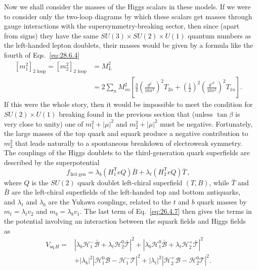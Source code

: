 Now we shall consider the masses of the Higgs scalars in these models. If
we were to consider only the two-loop diagrams by which these scalars get
masses through gauge interactions with the supersymmetry-breaking sector,
then since (apart from signs) they have the same
\(SU(3)\times SU(2)\times U(1)\) quantum numbers as the
left-handed lepton doublets, their masses would be given by a formula like
the fourth of Eqs.~\eqref{eq:28.6.4}
\begin{equation}
  \begin{aligned}
    [m_1^2]_{\text{2 loop}}=[m_2^2]_{\text{2 loop}}
    &=M_L^2\\
    &=2\sum_nM_{sn}^2
      \left[
        \frac{3}{4}\left(\frac{g^2}{16\pi^2}\right)^2T_{2n}
        +\left(\frac{1}{2}\right)^2
         \left(\frac{g'^2}{16\pi^2}\right)^2T_{1n}
      \right] .
  \end{aligned}
  \tag{28.6.23}\label{eq:28.6.23}
\end{equation}
If this were the whole story, then it would be impossible to meet the
condition for \(SU(2)\times U(1)\) breaking found in the previous
section that (unless \(\tan\beta\) is very close to unity) one of
\(m_1^2+\lvert\mu\rvert^2\) and \(m_2^2+\lvert\mu\rvert^2\) must be
negative. Fortunately, the large masses of the top quark and squark
produce a negative contribution to \(m_2^2\) that leads naturally to a
spontaneous breakdown of electroweak symmetry. The couplings of the Higgs
doublets to the third-generation quark superfields are described by the
superpotential
\begin{equation}
  f_{\text{3rd gen}}
  =\lambda_b(H_1^{\mathsf T}eQ)\bar B
   +\lambda_t(H_2^{\mathsf T}eQ)\bar T\,,
  \tag{28.6.24}\label{eq:28.6.24}
\end{equation}
where \(Q\) is the \(SU(2)\) quark doublet left-chiral superfield
\((T,B)\), while \(\bar T\) and \(\bar B\) are the left-chiral
superfields of the left-handed top and bottom antiquarks, and
\(\lambda_t\) and \(\lambda_b\) are the Yukawa couplings, related to the
\(t\) and \(b\) quark masses by \(m_t=\lambda_tv_2\) and
\(m_b=\lambda_bv_1\). The last term of Eq.~\eqref{eq:26.4.7} then gives
the terms in the potential involving an interaction between the squark
fields and Higgs fields as
\begin{equation}
  \begin{aligned}
    V_{\mathrm{sq}\,H}={}&
      \left|
        \lambda_b\mathcal{H}_1^-\bar{\mathcal B}
        +\lambda_t\mathcal{H}_2^0\bar{\mathcal T}
      \right|^2
      +\left|
        \lambda_b\mathcal{H}_1^0\bar{\mathcal B}
        +\lambda_t\mathcal{H}_2^+\bar{\mathcal T}
      \right|^2\\
      &+\lvert\lambda_b\rvert^2
      \left|\mathcal{H}_1^0\mathcal B-\mathcal{H}_1^-\mathcal T\right|^2
      +\lvert\lambda_t\rvert^2
      \left|\mathcal{H}_2^+\mathcal B-\mathcal{H}_2^0\mathcal T\right|^2 .
  \end{aligned}
  \tag{28.6.25}\label{eq:28.6.25}
\end{equation}
